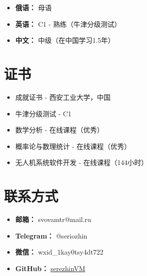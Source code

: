 \documentclass[12pt,a4paper]{article}
\begin{document}
\begin{itemize}[noitemsep]
    \item \textbf{俄语：} 母语
    \item \textbf{英语：} C1 - 熟练（牛津分级测试）
    \item \textbf{中文：} 中级（在中国学习1.5年）
\end{itemize}

\section{证书}

\begin{itemize}[noitemsep]
    \item 成就证书 - 西安工业大学，中国
    \item 牛津分级测试 - C1
    \item 数学分析 - 在线课程（优秀）
    \item 概率论与数理统计 - 在线课程（优秀）
    \item 无人机系统软件开发 - 在线课程（144小时）
\end{itemize}

\section{联系方式}

\begin{itemize}[noitemsep]
    \item \textbf{邮箱：} svovamtr@mail.ru
    \item \textbf{Telegram：} @seriozhin
    \item \textbf{微信：} wxid\_1kay0tsy4dt722
    \item \textbf{GitHub：} \href{https://github.com/serezhinVM}{serezhinVM}
\end{itemize}
\end{document}
